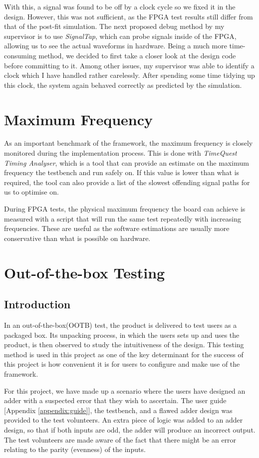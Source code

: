 With this, a signal was found to be off by a clock cycle so we fixed it in the design.
However, this was not sufficient, as the FPGA test results still differ from that of the post-fit simulation.
The next proposed debug method by my supervisor is to use \textit{SignalTap}, which can probe signals inside of the FPGA, allowing us to see the actual waveforms in hardware.
Being a much more time-consuming method, we decided to first take a closer look at the design code before committing to it.
Among other issues, my supervisor was able to identify a clock which I have handled rather carelessly.
After spending some time tidying up this clock, the system again behaved correctly as predicted by the simulation.

\section{Maximum Frequency}
As an important benchmark of the framework, the maximum frequency is closely monitored during the implementation process.
This is done with \textit{TimeQuest Timing Analyser}, which is a tool that can provide an estimate on the maximum frequency the testbench and run safely on.
If this value is lower than what is required, the tool can also provide a list of the slowest offending signal paths for us to optimise on.

During FPGA tests, the physical maximum frequency the board can achieve is measured with a script that will run the same test repeatedly with increasing frequencies.
These are useful as the software estimations are usually more conservative than what is possible on hardware.

\section{Out-of-the-box Testing}
\subsection{Introduction}
In an out-of-the-box(OOTB) test, the product is delivered to test users as a packaged box.
Its unpacking process, in which the users sets up and uses the product, is then observed to study the intuitiveness of the design.
This testing method is used in this project as one of the key determinant for the success of this project is how convenient it is for users to configure and make use of the framework.

For this project, we have made up a scenario where the users have designed an adder with a suspected error that they wish to ascertain.
The user guide [Appendix \ref{appendix:guide}], the testbench, and a flawed adder design was provided to the test volunteers.
An extra piece of logic was added to an adder design, so that if both inputs are odd, the adder will produce an incorrect output.
The test volunteers are made aware of the fact that there might be an error relating to the parity (evenness) of the inputs.

